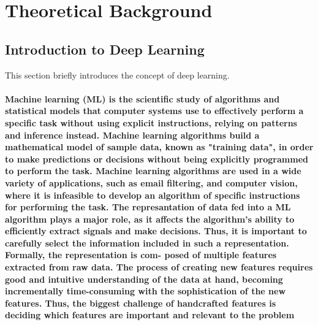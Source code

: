 \section{Theoretical Background}
\subsection{Introduction to Deep Learning}
This section briefly introduces the concept of deep learning.
\paragraph{
	Machine learning (ML) is the scientific study of algorithms and statistical models that computer systems use to effectively perform a specific task without using explicit instructions, relying on patterns and inference instead. Machine learning algorithms build a mathematical model of sample data, known as "training data", in order to make predictions or decisions without being explicitly programmed to perform the task. Machine learning algorithms are used in a wide variety of applications, such as email filtering, and computer vision, where it is infeasible to develop an algorithm of specific instructions for performing the task. The represantation of data fed into a ML algorithm plays a major role, as it affects the algorithm’s ability to efficiently extract signals and make decisions. Thus, it is important to carefully select the information included in such a representation. Formally, the representation is com- posed of multiple features extracted from raw data. The process of creating new features requires good and intuitive understanding of the data at hand, becoming incrementally time-consuming with the sophistication of the new features. Thus, the biggest challenge of handcrafted features is deciding which features are important and relevant to the problem \cite{Goodfellow-et-al-2016}
}
